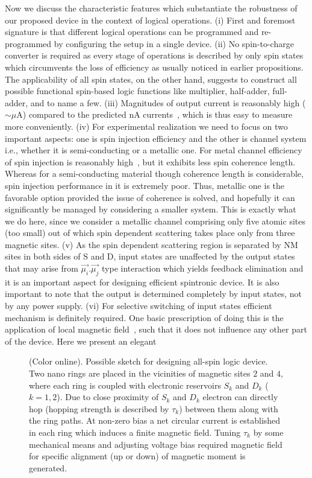 \documentclass[doublecol]{epl2}
\begin{document}
Now we discuss the characteristic features which 
substantiate the robustness of our proposed device in the context of logical
operations. (i) First and foremost signature is that different logical 
operations can be programmed and re-programmed by configuring the setup in
a single device. (ii) No spin-to-charge converter is required as every stage 
of operations is described by only spin states which circumvents the loss of
efficiency as usually noticed in earlier propositions. The applicability of
all spin states, on the other hand, suggests to construct all possible
functional spin-based logic functions like multiplier, half-adder, full-adder,
and to name a few. (iii) Magnitudes of output current is reasonably high
($\sim \mu$A) compared to the predicted nA currents~\cite{LGS1}, which is 
thus easy to measure more conveniently. (iv) For experimental realization 
we need to focus on two important aspects: one is spin injection efficiency
and the other is channel system i.e., whether it is semi-conducting or
a metallic one. For metal channel efficiency of spin injection is reasonably
high~\cite{LGS5}, but it exhibits less spin coherence length. Whereas for a 
semi-conducting material though coherence length is considerable, spin 
injection performance in it is extremely poor. Thus, metallic one is the
favorable option provided the issue of coherence is solved, and hopefully
it can significantly be managed by considering a smaller system. This 
is exactly what we do here, since we consider a metallic channel comprising 
only five atomic sites (too small) out of which spin dependent scattering
takes place only from three magnetic sites. (v) As the spin dependent 
scattering region is separated by NM sites in both sides of S and D, input
states are unaffected by the output states that may arise from
$\vec{\mu_i}.\vec{\mu_j}$ type interaction which yields feedback elimination
and it is an important aspect for designing efficient spintronic device.
It is also important to note that the output is determined completely by 
input states, not by any power supply. (vi) For selective switching of 
input states efficient mechanism is definitely required. One basic 
prescription of doing this is the application of local magnetic 
field~\cite{lidar,cir3}, such that it does not influence any other part of 
the device. Here we present an elegant 
\begin{figure}[ht]
{\centering {}\par}
\caption{(Color online). Possible sketch for designing all-spin logic device.
Two nano rings are placed in the vicinities of magnetic sites $2$ and $4$,
where each ring is coupled with electronic reservoirs $S_k$ and $D_k$ 
($k=1,2$). Due to close proximity of $S_k$ and $D_k$ electron can directly
hop (hopping strength is described by $\tau_k$) between them along with
the ring paths. At non-zero bias a net circular current is established in
each ring which induces a finite magnetic field. Tuning $\tau_k$ by some
mechanical means and adjusting voltage bias required magnetic field for 
specific alignment (up or down) of magnetic moment is generated.}
\label{f4}
\end{figure}
\end{document}
